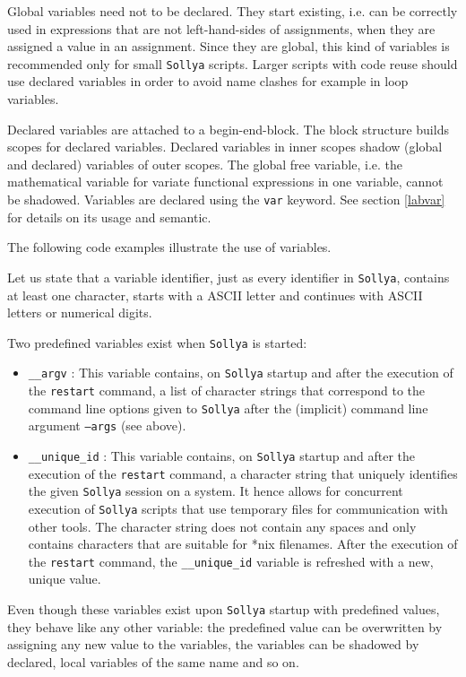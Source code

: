 \documentclass[a4paper]{article}
\newcommand{\key}[1]{\texttt{#1}}
\newcommand{\sollya}{\texttt{Sollya}\xspace}
\begin{document}
Global variables need not to be declared. They start existing,
i.e. can be correctly used in expressions that are not left-hand-sides
of assignments, when they are assigned a value in an assignment. Since
they are global, this kind of variables is recommended only for small
\sollya scripts.  Larger scripts with code reuse should use
declared variables in order to avoid name clashes for example in loop
variables.

Declared variables are attached to a begin-end-block. The block
structure builds scopes for declared variables. Declared variables in
inner scopes shadow (global and declared) variables of outer
scopes. The global free variable, i.e. the mathematical variable for
variate functional expressions in one variable, cannot be shadowed. Variables are
declared using the \key{var} keyword. See section \ref{labvar} for details
on its usage and semantic.

The following code examples illustrate the use of variables.




Let us state that a variable identifier, just as every identifier in
\sollya, contains at least one character, starts with a ASCII letter
and continues with ASCII letters or numerical digits.

Two predefined variables exist when \sollya is started: 
\begin{itemize}
\item \texttt{\_\_argv} : This variable contains, on \sollya startup
  and after the execution of the \texttt{restart} command, a list of
  character strings that correspond to the command line options given
  to \sollya after the (implicit) command line argument
  \texttt{--args} (see above).
\item \texttt{\_\_unique\_id} : This variable contains, on \sollya
  startup and after the execution of the \texttt{restart} command, a
  character string that uniquely identifies the given \sollya session
  on a system. It hence allows for concurrent execution of \sollya
  scripts that use temporary files for communication with other
  tools. The character string does not contain any spaces and only
  contains characters that are suitable for *nix filenames. After the
  execution of the \texttt{restart} command, the
  \texttt{\_\_unique\_id} variable is refreshed with a new, unique
  value.
\end{itemize}
Even though these variables exist upon \sollya startup with predefined
values, they behave like any other variable: the predefined value can
be overwritten by assigning any new value to the variables, the
variables can be shadowed by declared, local variables of the same
name and so on.
\end{document}
